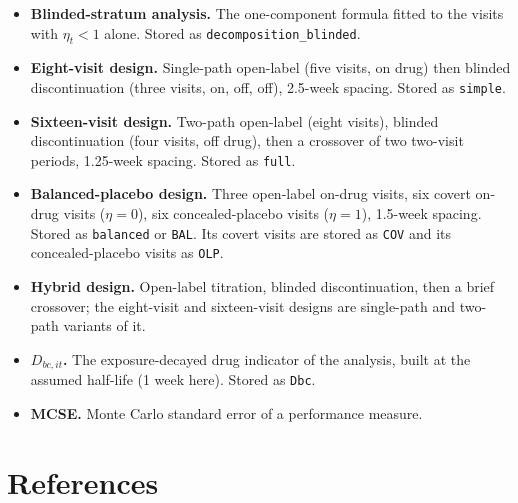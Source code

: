 \documentclass[
  11pt,
]{article}
\begin{document}
\begin{itemize}
\item
  \textbf{Blinded-stratum analysis.} The one-component formula fitted to the
  visits with \(\eta_t < 1\) alone. Stored as
  \texttt{decomposition\_blinded}.
\item
  \textbf{Eight-visit design.} Single-path open-label (five visits, on drug)
  then blinded discontinuation (three visits, on, off, off), 2.5-week
  spacing. Stored as \texttt{simple}.
\item
  \textbf{Sixteen-visit design.} Two-path open-label (eight visits), blinded
  discontinuation (four visits, off drug), then a crossover of two
  two-visit periods, 1.25-week spacing. Stored as \texttt{full}.
\item
  \textbf{Balanced-placebo design.} Three open-label on-drug visits, six covert
  on-drug visits (\(\eta = 0\)), six concealed-placebo visits (\(\eta = 1\)),
  1.5-week spacing. Stored as \texttt{balanced} or \texttt{BAL}. Its
  covert visits are stored as \texttt{COV} and its concealed-placebo
  visits as \texttt{OLP}.
\item
  \textbf{Hybrid design.} Open-label titration, blinded discontinuation, then a
  brief crossover; the eight-visit and sixteen-visit designs are
  single-path and two-path variants of it.
\item
  \textbf{\(D_{bc,it}\).} The exposure-decayed drug indicator of the analysis,
  built at the assumed half-life (1 week here). Stored as \texttt{Dbc}.
\item
  \textbf{MCSE.} Monte Carlo standard error of a performance measure.
\end{itemize}

\section{References}\label{references}
\end{document}
